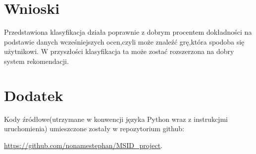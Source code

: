 \documentclass{article}
\begin{document}
\section{Wnioski}
Przedstawiona klasyfikacja działa poprawnie z dobrym procentem dokładności na podstawie danych wcześniejszych ocen,czyli może znaleźć grę,która spodoba się użytnikowi. W przyszłości klasyfikacja ta może zostać rozszerzona na dobry system rekomendacji.


\appendix
\section{Dodatek}
Kody źródłowe(utrzymane w konwencji języka Python wraz z instrukcjmi uruchomienia) umieszczone zostały w repozytorium github:

\noindent \url{https://github.com/nonamestephan/MSID_project}.
\end{document}

